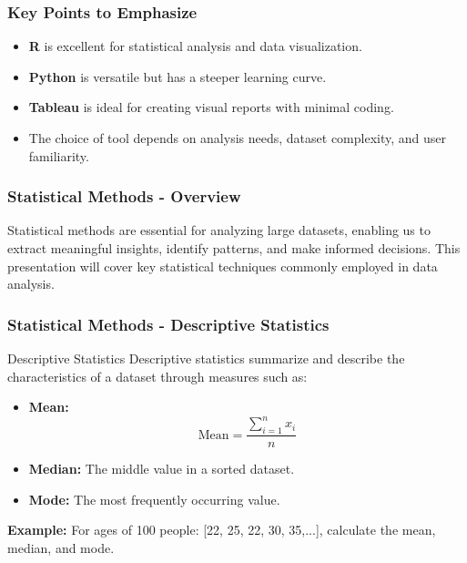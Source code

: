 \documentclass[aspectratio=169]{beamer}
\begin{document}
\begin{frame}
    \frametitle{Key Points to Emphasize}
    \begin{itemize}
        \item \textbf{R} is excellent for statistical analysis and data visualization.
        \item \textbf{Python} is versatile but has a steeper learning curve.
        \item \textbf{Tableau} is ideal for creating visual reports with minimal coding.
        \item The choice of tool depends on analysis needs, dataset complexity, and user familiarity.
    \end{itemize}
\end{frame}

\begin{frame}[fragile]
    \frametitle{Statistical Methods - Overview}
    Statistical methods are essential for analyzing large datasets, enabling us to extract meaningful insights, identify patterns, and make informed decisions. This presentation will cover key statistical techniques commonly employed in data analysis.
\end{frame}

\begin{frame}[fragile]
    \frametitle{Statistical Methods - Descriptive Statistics}
    \begin{block}{Descriptive Statistics}
        Descriptive statistics summarize and describe the characteristics of a dataset through measures such as:
        \begin{itemize}
            \item \textbf{Mean:} 
            \begin{equation}
            \text{Mean} = \frac{\sum_{i=1}^{n} x_i}{n}
            \end{equation}
            \item \textbf{Median:} The middle value in a sorted dataset.
            \item \textbf{Mode:} The most frequently occurring value.
        \end{itemize}
    \end{block}
    
    \textbf{Example:} For ages of 100 people: [22, 25, 22, 30, 35,...], calculate the mean, median, and mode.
\end{frame}
\end{document}

